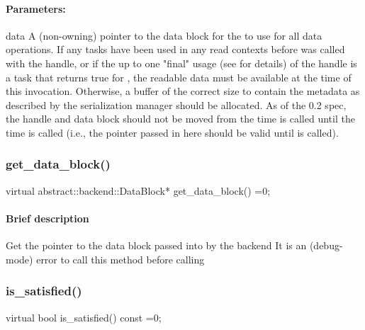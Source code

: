 \paragraph{Parameters:} 
\begin{compactdesc}
\item[data] A (non-owning) pointer to the data block for the  to use for
       all data operations.  If any tasks have been used in any read contexts before
        was called with the handle, or if the up to one
       "final" usage (see  for details) of the handle is a task
       that returns true for , the readable data must be available
       at the time of this invocation.  Otherwise, a buffer of the correct size to contain
       the metadata as described by the serialization manager should be allocated.  As of
       the 0.2 spec, the handle and data block should not be moved from the time
        is called until the time  is called
       (i.e., the pointer passed in here should be valid until  is called).
\end{compactdesc}

\subsubsection{get\_data\_block()}
\begin{CppCode}
    virtual abstract::backend::DataBlock*
    get_data_block() =0;
\end{CppCode}

\paragraph{Brief description} Get the pointer to the data block passed into  by the backend
       It is an (debug-mode) error to call this method before calling 


\subsubsection{is\_satisfied()}
\begin{CppCode}
    virtual bool
    is_satisfied() const =0;
\end{CppCode}

